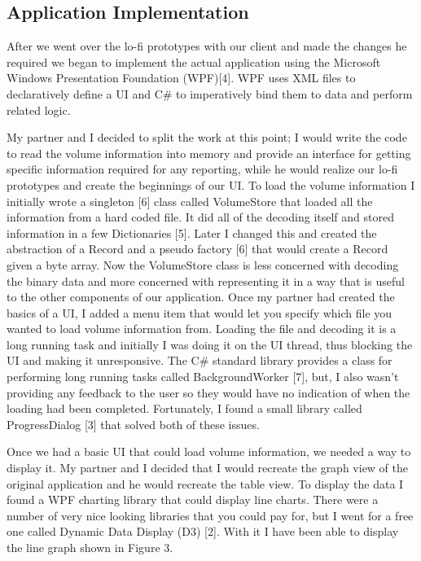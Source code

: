 \documentclass{article}
\begin{document}
\subsection{Application Implementation}
After we went over the lo-fi prototypes with our client and
made the changes he required we began to implement the
actual application using the Microsoft Windows Presentation
Foundation (WPF)[4]. WPF uses XML files to declaratively
define a UI and C\# to imperatively bind them to data and
perform related logic.

My partner and I decided to split the work at this point; I
would write the code to read the volume information into
memory and provide an interface for getting specific
information required for any reporting, while he would realize
our lo-fi prototypes and create the beginnings of our UI.
To load the volume information I initially wrote a singleton
[6] class called VolumeStore that loaded all the information
from a hard coded file. It did all of the decoding itself and
stored information in a few Dictionaries [5]. Later I changed
this and created the abstraction of a Record and a pseudo
factory [6] that would create a Record given a byte array. Now
the VolumeStore class is less concerned with decoding the
binary data and more concerned with representing it in a way
that is useful to the other components of our application.
Once my partner had created the basics of a UI, I added a
menu item that would let you specify which file you wanted to
load volume information from. Loading the file and decoding
it is a long running task and initially I was doing it on the UI
thread, thus blocking the UI and making it unresponsive. The
C\# standard library provides a class for performing long
running tasks called BackgroundWorker [7], but, I also wasn’t
providing any feedback to the user so they would have no
indication of when the loading had been completed.
Fortunately, I found a small library called ProgressDialog [3]
that solved both of these issues.

Once we had a basic UI that could load volume
information, we needed a way to display it. My partner and I
decided that I would recreate the graph view of the original
application and he would recreate the table view. To display
the data I found a WPF charting library that could display line
charts. There were a number of very nice looking libraries that
you could pay for, but I went for a free one called Dynamic
Data Display (D3) [2]. With it I have been able to display the
line graph shown in Figure 3.
\end{document}
